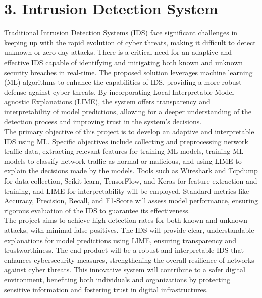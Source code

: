 \documentclass[12pt]{book}
\begin{document}
	\chapter*{3. Intrusion Detection System}
	\thispagestyle{empty}
	Traditional Intrusion Detection Systems (IDS) face significant challenges in keeping up with the rapid evolution of cyber threats, making it difficult to detect unknown or zero-day attacks. There is a critical need for an adaptive and effective IDS capable of identifying and mitigating both known and unknown security breaches in real-time. The proposed solution leverages machine learning (ML) algorithms to enhance the capabilities of IDS, providing a more robust defense against cyber threats. By incorporating Local Interpretable Model-agnostic Explanations (LIME), the system offers transparency and interpretability of model predictions, allowing for a deeper understanding of the detection process and improving trust in the system's decisions.\\
	
	The primary objective of this project is to develop an adaptive and interpretable IDS using ML. Specific objectives include collecting and preprocessing network traffic data, extracting relevant features for training ML models, training ML models to classify network traffic as normal or malicious, and using LIME to explain the decisions made by the models. Tools such as Wireshark and Tcpdump for data collection, Scikit-learn, TensorFlow, and Keras for feature extraction and training, and LIME for interpretability will be employed. Standard metrics like Accuracy, Precision, Recall, and F1-Score will assess model performance, ensuring rigorous evaluation of the IDS to guarantee its effectiveness.\\
	
	The project aims to achieve high detection rates for both known and unknown attacks, with minimal false positives. The IDS will provide clear, understandable explanations for model predictions using LIME, ensuring transparency and trustworthiness. The end product will be a robust and interpretable IDS that enhances cybersecurity measures, strengthening the overall resilience of networks against cyber threats. This innovative system will contribute to a safer digital environment, benefiting both individuals and organizations by protecting sensitive information and fostering trust in digital infrastructures.\\
	
\end{document}
